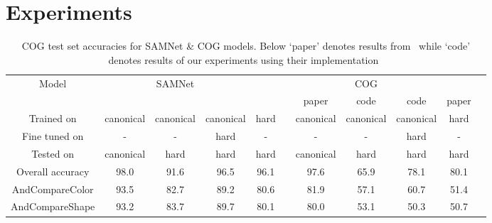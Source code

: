 \section{Experiments}

\begin{table}[t]
\caption{COG test set accuracies for SAMNet \& COG models. Below `paper' denotes results from~\cite{yang2018dataset} 
	while `code' denotes results of our experiments using their implementation~\cite{yang2018implement}}
\centering
\begin{adjustbox}{width=\textwidth}
\begin{tabular}{ccccccccccc}
	\toprule
	Model & & SAMNet & && && COG&& \\
	\cmidrule{2-5} \cmidrule{7-11} 
	&&&&& & paper & code & code & paper&\\
	\cmidrule{7-9} \cmidrule{10-11}
	Trained on       & canonical & canonical & canonical & hard &           &  canonical  & canonical  & canonical & hard \\ 
	Fine tuned on  & - & - & hard  & - &           & -   & - & hard & - \\ 
	Tested on        & canonical & hard & hard & hard &            &canonical  & hard & hard & hard  \\ 
	\midrule	
	Overall accuracy & 98.0 & 91.6 & 96.5  & 96.1 &         & 97.6  & 65.9 & 78.1& 80.1 \\ 	
	\midrule 	
	AndCompareColor	&	93.5		&	82.7	&	89.2	&  80.6 &		&81.9	&57.1&60.7  &	51.4 \\ 
	AndCompareShape	&	93.2 		&	83.7	&	89.7	& 80.1 &	&	80.0	&53.1	&50.3 &50.7 \\ 
	\bottomrule
\end{tabular}
\end{adjustbox}
\label{tab:results}
\end{table}

